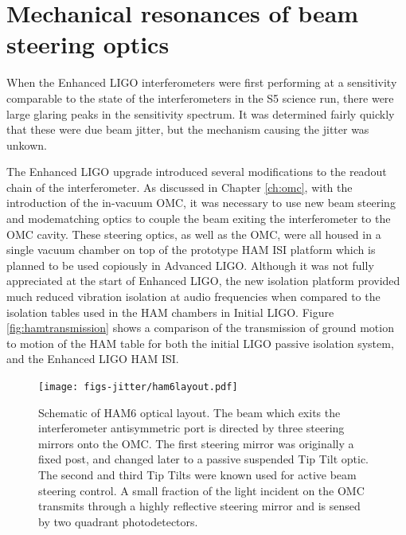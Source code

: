 \section{Mechanical resonances of beam steering optics}
When the Enhanced LIGO interferometers were first performing at a sensitivity comparable to the state of the interferometers in the S5 science run, there were large glaring peaks in the sensitivity spectrum. %
It was determined fairly quickly that these were due beam jitter, but the mechanism causing the jitter was unkown.

The Enhanced LIGO upgrade introduced several modifications to the readout chain of the interferometer. %
As discussed in Chapter \ref{ch:omc}, with the introduction of the in-vacuum OMC, it was necessary to use new beam steering and modematching optics to couple the beam exiting the interferometer to the OMC cavity. %
These steering optics, as well as the OMC, were all housed in a single vacuum chamber on top of the prototype HAM ISI platform which is planned to be used copiously in Advanced LIGO. %
Although it was not fully appreciated at the start of Enhanced LIGO, the new isolation platform provided much reduced vibration isolation at audio frequencies when compared to the isolation tables used in the HAM chambers in Initial LIGO. %
Figure \ref{fig:hamtransmission} shows a comparison of the transmission of ground motion to motion of the HAM table for both the initial LIGO passive isolation system, and the Enhanced LIGO HAM ISI.

\begin{figure}
  \begin{center}
  \leavevmode
  \texttt{[image: figs-jitter/ham6layout.pdf]}
  \end{center}
  \caption[Schematic of HAM6 optical layout.]{Schematic of HAM6 optical layout. The beam which exits the interferometer antisymmetric port is directed by three steering mirrors onto the OMC. The first steering mirror was originally a fixed post, and changed later to a passive suspended Tip Tilt optic. The second and third Tip Tilts were known used for active beam steering control. A small fraction of the light incident on the OMC transmits through a highly reflective steering mirror and is sensed by two quadrant photodetectors.}
  \label{fig:ham6layout}
\end{figure}

